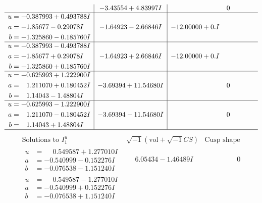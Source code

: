 \documentclass[1p]{elsarticle_modified}
\theoremstyle{definition}
\newcommand{\I}{\sqrt{-1}}
\begin{document}
$$\begin{array}{c|c|c}
 & -3.43554 + 4.83997 I & \phantom{-0.000000 } 0 \\ \hline\begin{aligned}
u &= -0.387993 + 0.493788 I \\
a &= -1.85677 - 0.29078 I \\
b &= -1.325860 - 0.185760 I\end{aligned}
 & -1.64923 - 2.66846 I & -12.00000 + 0. I\phantom{ +0.000000I} \\ \hline\begin{aligned}
u &= -0.387993 - 0.493788 I \\
a &= -1.85677 + 0.29078 I \\
b &= -1.325860 + 0.185760 I\end{aligned}
 & -1.64923 + 2.66846 I & -12.00000 + 0. I\phantom{ +0.000000I} \\ \hline\begin{aligned}
u &= -0.625993 + 1.222900 I \\
a &= \phantom{-}1.211070 + 0.180452 I \\
b &= \phantom{-}1.14043 - 1.48804 I\end{aligned}
 & -3.69394 + 11.54680 I & \phantom{-0.000000 } 0 \\ \hline\begin{aligned}
u &= -0.625993 - 1.222900 I \\
a &= \phantom{-}1.211070 - 0.180452 I \\
b &= \phantom{-}1.14043 + 1.48804 I\end{aligned}
 & -3.69394 - 11.54680 I & \phantom{-0.000000 } 0\\
 \hline 
 \end{array}$$\newpage$$\begin{array}{c|c|c}  
\text{Solutions to }I^u_{1}& \I (\text{vol} + \sqrt{-1}CS) & \text{Cusp shape}\\
 \hline 
\begin{aligned}
u &= \phantom{-}0.549587 + 1.277010 I \\
a &= -0.540999 - 0.152276 I \\
b &= -0.076538 - 1.151240 I\end{aligned}
 & \phantom{-}6.05434 - 1.46489 I & \phantom{-0.000000 } 0 \\ \hline\begin{aligned}
u &= \phantom{-}0.549587 - 1.277010 I \\
a &= -0.540999 + 0.152276 I \\
b &= -0.076538 + 1.151240 I\end{aligned}

\end{array}$$
\end{document}
